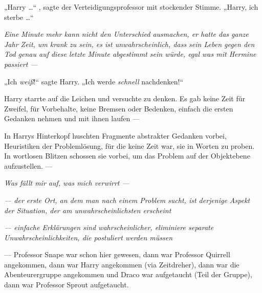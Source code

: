 „Harry …“ , sagte der Verteidigungsprofessor mit stockender Stimme.
„Harry, ich sterbe …“

\emph{Eine Minute mehr kann nicht den Unterschied ausmachen, er hatte das \emph{ganze Jahr} Zeit, um krank zu sein, es ist \emph{unwahrscheinlich}, dass sein Leben gegen den Tod genau auf diese letzte Minute abgestimmt sein würde, egal was mit Hermine passiert —}

„Ich \emph{weiß}!“ sagte Harry.
„Ich werde \emph{schnell} nachdenken!“

Harry starrte auf die Leichen und versuchte zu denken. Es gab keine Zeit für Zweifel, für Vorbehalte, keine Bremsen oder Bedenken, einfach die ersten Gedanken nehmen und mit ihnen laufen —

In Harrys Hinterkopf huschten Fragmente abstrakter Gedanken vorbei, Heuristiken der Problemlösung, für die keine Zeit war, sie in Worten zu proben. In wortlosen Blitzen schossen sie vorbei, um das Problem auf der Objektebene aufzustellen. —

\emph{Was fällt mir auf, was mich verwirrt —}

\emph{— der erste Ort, an dem man nach einem Problem sucht, ist derjenige Aspekt der Situation, der am unwahrscheinlichsten erscheint}

\emph{— einfache Erklärungen sind wahrscheinlicher, eliminiere separate Unwahrscheinlichkeiten, die postuliert werden müssen}

— Professor Snape war schon hier gewesen, dann war Professor Quirrell angekommen, dann war Harry angekommen (via Zeitdreher), dann war die Abenteurergruppe angekommen und Draco war aufgetaucht (Teil der Gruppe), dann war Professor Sprout aufgetaucht.

